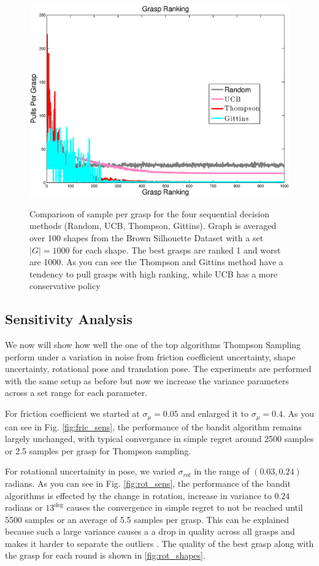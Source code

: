 \documentclass[journal,transmag]{IEEEtran}%
\begin{document}
\begin{figure}[ht!]
\centering
\includegraphics[width = 16.5cm, height = 9cm]{matlab_figures/pulls_per_grasp.eps}
\caption{ \footnotesize Comparison of sample per grasp for the four sequential decision methods (Random, UCB, Thompson, Gittins). Graph is averaged over 100 shapes from the Brown Silhouette Dataset \cite{brown} with a set $|G|=1000$ for each shape. The best grasps are ranked 1 and worst are 1000.  As you can see the Thompson and Gittins method have a tendency to pull grasps with high ranking, while UCB has a more conservative policy \cite{best_arm}}
\vspace*{-10pt}
\label{fig:pulls_per_grasp}
\end{figure}


\subsection{Sensitivity Analysis }
We now will show how well the one of the top algorithms Thompson Sampling perform under a variation in noise from friction coefficient uncertainty, shape uncertainty, rotational pose and translation pose. The experiments are performed with the same setup as before but now we increase the variance parameters across a set range for each parameter. 

For friction coefficient we started at $\sigma_{\mu} = 0.05$ and enlarged it to $\sigma_{\mu}  = 0.4$. As you can see in Fig. \ref{fig:fric_sens}, the performance of the bandit algorithm remains largely unchanged, with typical convergance in simple regret around 2500 samples or 2.5 samples per grasp for Thompson sampling. 

For rotational uncertainity in pose, we varied $\sigma_{rot}$ in the range of $(0.03, 0.24)$ radians. As you can see in Fig. \ref{fig:rot_sens}, the performance of the bandit algorithms is effected by the change in rotation, increase in variance to $0.24$ radians or $13^{\deg}$  causes the convergence in simple regret to not be reached until 5500 samples or an average of 5.5 samples per grasp. This can be explained because such a large variance causes a a drop in quality across all grasps and makes it harder to separate the outliers \cite{gabillon2012bes}. The quality of the best grasp along with the grasp for each round is shown in \ref{fig:rot_shapes}. 
\end{document}
